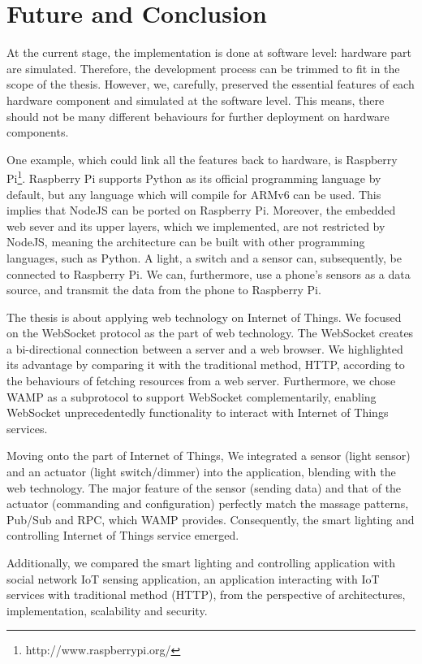 \chapter{Future and Conclusion}
\label{chapter:future-and-conclusion}

At the current stage, the implementation is done at software level: hardware part are simulated. Therefore, the development process can be trimmed to fit in the scope of the thesis. However, we, carefully, preserved the essential features of each hardware component and simulated at the software level. This means, there should not be many different behaviours for further deployment on hardware components. 

One example, which could link all the features back to hardware, is Raspberry Pi\footnote{http://www.raspberrypi.org/}. Raspberry Pi supports Python as its official programming language by default, but any language which will compile for ARMv6 can be used. This implies that NodeJS can be ported on Raspberry Pi. Moreover, the embedded web sever and its upper layers, which we implemented, are not restricted by NodeJS, meaning the architecture can be built with other programming languages, such as Python. A light, a switch and a sensor can, subsequently, be connected to Raspberry Pi. We can, furthermore, use a phone's sensors as a data source, and transmit the data from the phone to Raspberry Pi.

The thesis is about applying web technology on Internet of Things. We focused on the WebSocket protocol as the part of web technology. The WebSocket creates a bi-directional connection between a server and a web browser. We highlighted its advantage by comparing it with the traditional method, HTTP, according to the behaviours of fetching resources from a web server. Furthermore, we chose WAMP as a subprotocol to support WebSocket complementarily, enabling WebSocket unprecedentedly functionality to interact with Internet of Things services. 

Moving onto the part of Internet of Things, We integrated a sensor (light sensor) and an actuator (light switch/dimmer) into the application, blending with the web technology. The major feature of the sensor (sending data) and that of the actuator (commanding and configuration) perfectly match the massage patterns, Pub/Sub and RPC, which WAMP provides. Consequently, the smart lighting and controlling Internet of Things service emerged. 

Additionally, we compared the smart lighting and controlling application with social network IoT sensing application, an application interacting with IoT services with traditional method (HTTP), from the perspective of architectures, implementation, scalability and security. 

